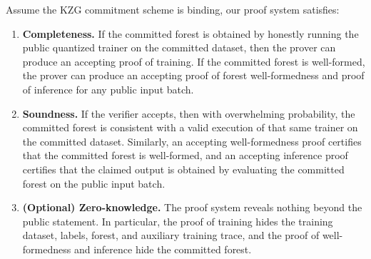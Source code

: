 \begin{theorem}
\label{thm:main-informal}
Assume the KZG commitment scheme is binding,
our proof system satisfies:
\begin{enumerate}
    \item \textbf{Completeness.} If the committed forest is obtained by honestly
    running the public quantized trainer on the committed dataset, then the
    prover can produce an accepting proof of training.
    If the committed forest is well-formed,
    the prover can produce an accepting proof of forest well-formedness and proof of inference for any public input batch.

    \item \textbf{Soundness.} If the verifier accepts, then with overwhelming
    probability, the committed forest is consistent with a valid execution of
    that same trainer on the committed dataset. Similarly, an accepting
    well-formedness proof certifies that the committed forest is well-formed, and
    an accepting
    inference proof certifies that the claimed output is obtained by evaluating
    the committed forest on the public input batch.

    \item \textbf{(Optional) Zero-knowledge.} 
    The proof system reveals nothing beyond the public statement. In particular, the proof of training hides 
    the training dataset, labels, forest, and auxiliary training trace, and the proof of well-formedness and inference hide the committed forest.
\end{enumerate}
\end{theorem}
